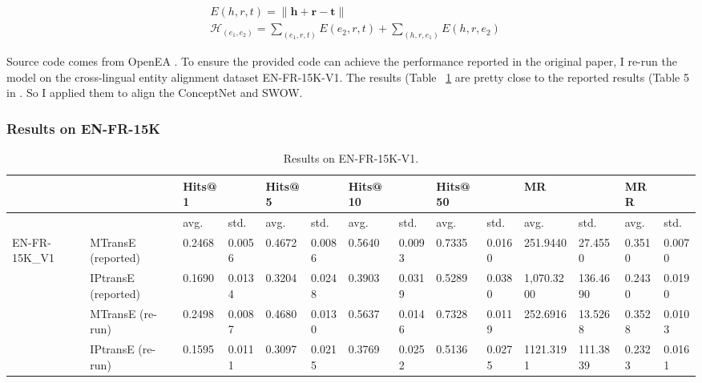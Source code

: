 \begin{align}
    & E(h, r, t)=\|\mathbf{h}+\mathbf{r}-\mathbf{t}\| \\
    & \mathcal{H}_{\left(e_{1}, e_{2}\right)}=\sum_{\left(e_{1}, r, t\right)} E\left(e_{2}, r, t\right)+\sum_{\left(h, r, e_{1}\right)} E\left(h, r, e_{2}\right)
\end{align}

Source code comes from OpenEA \cite{Sun2020ABS}. To ensure the provided code can achieve the performance reported in the original paper, I re-run the model on the cross-lingual entity alignment dataset EN-FR-15K-V1. The results (Table ~\ref{tab:results-on-en-fr-15k-v1} are pretty close to the reported results (Table 5 in \citep{Sun2020ABS}. So I applied them to align the ConceptNet and SWOW.

\subsubsection{Results on EN-FR-15K}
\begin{table}[!ht]
  \begin{adjustbox}{max width=\textwidth}
    \centering
    \begin{tabular}{@{}llllllllllllll@{}}
                               &                     & Hits@1 &        & Hits@5 &        & Hits@10 &        & Hits@50 &        & MR         &          & MRR    &        \\\hline
                               &                     & avg.   & std.   & avg.   & std.   & avg.    & std.   & avg.    & std.   & avg.       & std.     & avg.   & std.   \\\hline
\multirow{4}{*}{EN-FR-15K\_V1} & MTransE (reported)  & 0.2468 & 0.0056 & 0.4672 & 0.0086 & 0.5640  & 0.0093 & 0.7335  & 0.0160 & 251.9440   & 27.4550  & 0.3510 & 0.0070 \\
                               & IPtransE (reported) & 0.1690 & 0.0134 & 0.3204 & 0.0248 & 0.3903  & 0.0319 & 0.5289  & 0.0380 & 1,070.3200 & 136.4690 & 0.2430 & 0.0190 \\
                               & MTransE (re-run)    & 0.2498 & 0.0087 & 0.4680 & 0.0130 & 0.5637  & 0.0146 & 0.7328  & 0.0119 & 252.6916   & 13.5268  & 0.3528 & 0.0103 \\
                               & IPtransE (re-run)   & 0.1595 & 0.0111 & 0.3097 & 0.0215 & 0.3769  & 0.0252 & 0.5136  & 0.0275 & 1121.3191  & 111.3839 & 0.2323 & 0.0161\\\hline
\end{tabular}
\end{adjustbox}
\caption{Results on EN-FR-15K-V1.}
\label{tab:results-on-en-fr-15k-v1}
\end{table}

